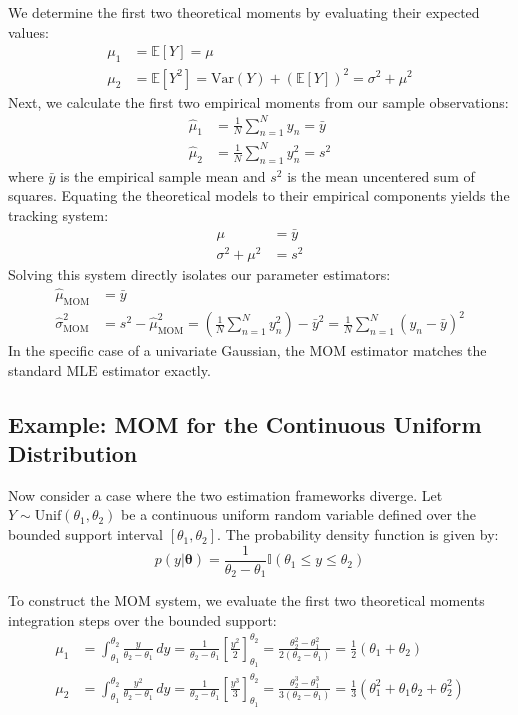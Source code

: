 \documentclass{article}
\begin{document}
We determine the first two theoretical moments by evaluating their expected values:
\begin{align}
\mu_1 &= \mathbb{E}[Y] = \mu \\
\mu_2 &= \mathbb{E}[Y^2] = \text{Var}(Y) + \left(\mathbb{E}[Y]\right)^2 = \sigma^2 + \mu^2
\end{align}
Next, we calculate the first two empirical moments from our sample observations:
\begin{align}
\hat{\mu}_1 &= \frac{1}{N} \sum_{n=1}^N y_n = \bar{y} \\
\hat{\mu}_2 &= \frac{1}{N} \sum_{n=1}^N y_n^2 = s^2
\end{align}
where $\bar{y}$ is the empirical sample mean and $s^2$ is the mean uncentered sum of squares. Equating the theoretical models to their empirical components yields the tracking system:
\begin{align}
\mu &= \bar{y} \\
\sigma^2 + \mu^2 &= s^2
\end{align}
Solving this system directly isolates our parameter estimators:
\begin{align}
\hat{\mu}_{\text{MOM}} &= \bar{y} \\
\hat{\sigma}^2_{\text{MOM}} &= s^2 - \hat{\mu}_{\text{MOM}}^2 = \left( \frac{1}{N} \sum_{n=1}^N y_n^2 \right) - \bar{y}^2 = \frac{1}{N} \sum_{n=1}^N (y_n - \bar{y})^2
\end{align}
In the specific case of a univariate Gaussian, the $\text{MOM}$ estimator matches the standard $\text{MLE}$ estimator exactly.

\subsection{Example: MOM for the Continuous Uniform Distribution}

Now consider a case where the two estimation frameworks diverge. Let $Y \sim \text{Unif}(\theta_1, \theta_2)$ be a continuous uniform random variable defined over the bounded support interval $[\theta_1, \theta_2]$. The probability density function is given by:
\begin{equation}
p(y | \boldsymbol{\theta}) = \frac{1}{\theta_2 - \theta_1} \mathbb{I}(\theta_1 \le y \le \theta_2)
\end{equation}

To construct the $\text{MOM}$ system, we evaluate the first two theoretical moments integration steps over the bounded support:
\begin{align}
\mu_1 &= \int_{\theta_1}^{\theta_2} \frac{y}{\theta_2 - \theta_1} \, dy = \frac{1}{\theta_2 - \theta_1} \left[ \frac{y^2}{2} \right]_{\theta_1}^{\theta_2} = \frac{\theta_2^2 - \theta_1^2}{2(\theta_2 - \theta_1)} = \frac{1}{2}(\theta_1 + \theta_2) \\
\mu_2 &= \int_{\theta_1}^{\theta_2} \frac{y^2}{\theta_2 - \theta_1} \, dy = \frac{1}{\theta_2 - \theta_1} \left[ \frac{y^3}{3} \right]_{\theta_1}^{\theta_2} = \frac{\theta_2^3 - \theta_1^3}{3(\theta_2 - \theta_1)} = \frac{1}{3}(\theta_1^2 + \theta_1\theta_2 + \theta_2^2)
\end{align}
\end{document}
